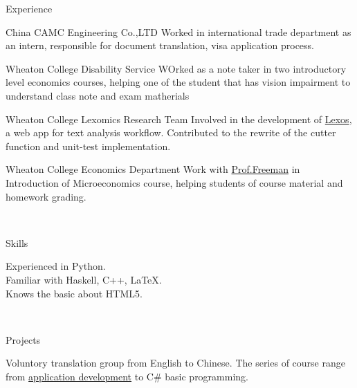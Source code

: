 \documentclass[]{resume-knyte}
\begin{document}
\begin{topic}{Experience}


    {China CAMC Engineering Co.,LTD}
    {Worked in international trade department as an intern, responsible for document translation, visa application process.}

    {Wheaton College Disability Service}
    {WOrked as a note taker in two introductory level economics courses, 
    helping one of the student that has vision impairment to understand class note and exam matherials}

    {Wheaton College Lexomics Research Team}
    {Involved in the development of \href{https://github.com/WheatonCS/Lexos}{Lexos}, a web app for text analysis workflow.
    Contributed to the rewrite of the cutter function and unit-test implementation.}


    {Wheaton College Economics Department}
    {Work with \href{https://wheatoncollege.edu/academics/faculty-directory/james-freeman/}{Prof.Freeman}
    in Introduction of Microeconomics course, helping students of course material and homework grading.}

\\ %
\end{topic}


\begin{topic}{Skills}


    {Experienced in Python.\\
    Familiar with Haskell, C++, \LaTeX{}.\\
    Knows the basic about HTML5.}

    \\ %
\end{topic}


\begin{topic}{Projects}


    {Voluntory translation group from English to Chinese.}
    {The series of course range from \href{https://github.com/chantisnake/AbsoluteBeginnersWin10}{application development} to C\# basic programming.}

\end{topic}
\end{document}

